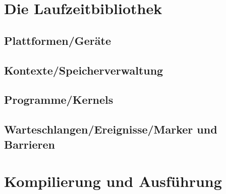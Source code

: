 \documentclass{beamer}
\begin{document}
\section{Die Laufzeitbibliothek}
\subsection{Plattformen/Geräte}
\subsection{Kontexte/Speicherverwaltung}
\subsection{Programme/Kernels}
\subsection{Warteschlangen/Ereignisse/Marker und Barrieren}

\section{Kompilierung und Ausführung}
\end{document}
